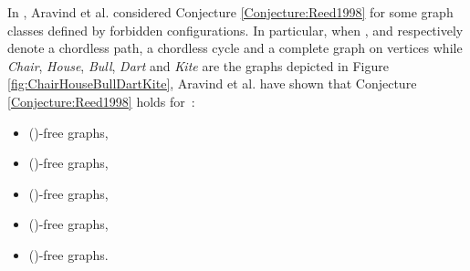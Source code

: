 \documentclass{amsart}
\theoremstyle{definition}
\theoremstyle{remark}
\begin{document}
In \cite{AraKarSub2011}, Aravind et al. considered Conjecture \ref{Conjecture:Reed1998} for some graph classes defined by forbidden configurations.
In particular, when ,  and  respectively denote a chordless path, a chordless cycle and a complete graph on  vertices while {\em Chair},
 {\em House}, {\em Bull}, {\em Dart} and {\em Kite} are the graphs depicted in 
Figure \ref{fig:ChairHouseBullDartKite}, Aravind et al. have shown that Conjecture \ref{Conjecture:Reed1998} holds for~:
\begin{itemize}
 \item ()-free graphs,
 \item ()-free graphs,
 \item ()-free graphs,
 \item ()-free graphs,
 \item ()-free graphs.
\end{itemize}
\end{document}

